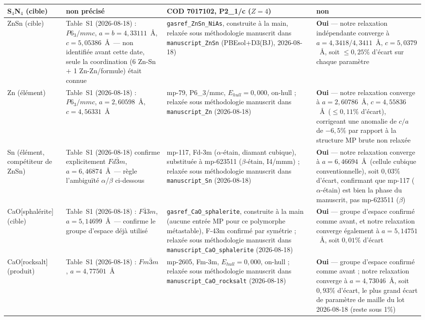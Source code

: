 \begin{longtable}{@{}p{2.6cm} p{3.0cm} p{3.6cm} p{5.2cm}@{}}
\midrule
S$_4$N$_4$ (cible) & non précisé & COD 7017102, P2\_1/c ($Z=4$) & non \\
\midrule
ZnSn (cible) & Table~S1 (2026-08-18) : $P6_3/mmc$, $a=b=4{,}33111$~\AA, $c=5{,}05386$~\AA\ --- non identifiée avant cette date, seule la coordination (6 Zn-Sn $+$ 1 Zn-Zn/formule) était connue & \texttt{gasref\_ZnSn\_NiAs}, construite à la main, relaxée sous méthodologie manuscrit dans \texttt{manuscript\_ZnSn} (PBEsol+D3(BJ), 2026-08-18) & \textbf{Oui} --- notre relaxation indépendante converge à $a=4{,}3418$/$4{,}3411$~\AA, $c=5{,}0379$~\AA, soit $\leq 0{,}25\%$ d'écart sur chaque paramètre \\
\midrule
Zn (élément) & Table~S1 (2026-08-18) : $P6_3/mmc$, $a=2{,}60598$~\AA, $c=4{,}56331$~\AA & mp-79, P6\_3/mmc, $E_{hull}=0{,}000$, on-hull ; relaxée sous méthodologie manuscrit dans \texttt{manuscript\_Zn} (2026-08-18) & \textbf{Oui} --- notre relaxation converge à $a=2{,}60786$~\AA, $c=4{,}55836$~\AA\ ($\leq 0{,}11\%$ d'écart), corrigeant une anomalie de $c/a$ de $-6{,}5\%$ par rapport à la structure MP brute non relaxée \\
\midrule
Sn (élément, compétiteur de ZnSn) & Table~S1 (2026-08-18) confirme explicitement $Fd\bar{3}m$, $a=6{,}46874$~\AA\ --- règle l'ambiguïté $\alpha$/$\beta$ ci-dessous & mp-117, Fd-3m ($\alpha$-étain, diamant cubique), substituée à mp-623511 ($\beta$-étain, I4/mmm) ; relaxée sous méthodologie manuscrit dans \texttt{manuscript\_Sn} (2026-08-18) & \textbf{Oui} --- notre relaxation converge à $a=6{,}46694$~\AA\ (cellule cubique conventionnelle), soit $0{,}03\%$ d'écart, confirmant que mp-117 ($\alpha$-étain) est bien la phase du manuscrit, pas mp-623511 ($\beta$) \\
\midrule
CaO[sphalérite] (cible) & Table~S1 (2026-08-18) : $F\bar{4}3m$, $a=5{,}14699$~\AA\ --- confirme le groupe d'espace déjà utilisé & \texttt{gasref\_CaO\_sphalerite}, construite à la main (aucune entrée MP pour ce polymorphe métastable), F-43m confirmé par symétrie ; relaxée sous méthodologie manuscrit dans \texttt{manuscript\_CaO\_sphalerite} (2026-08-18) & \textbf{Oui} --- groupe d'espace confirmé comme avant, et notre relaxation converge également à $a=5{,}14751$~\AA, soit $0{,}01\%$ d'écart \\
\midrule
CaO[rocksalt] (produit) & Table~S1 (2026-08-18) : $Fm\bar{3}m$, $a=4{,}77501$~\AA & mp-2605, Fm-3m, $E_{hull}=0{,}000$, on-hull ; relaxée sous méthodologie manuscrit dans \texttt{manuscript\_CaO\_rocksalt} (2026-08-18) & \textbf{Oui} --- groupe d'espace confirmé comme avant ; notre relaxation converge à $a=4{,}73046$~\AA, soit $0{,}93\%$ d'écart, le plus grand écart de paramètre de maille du lot 2026-08-18 (reste sous 1\%) \\

\end{longtable}
